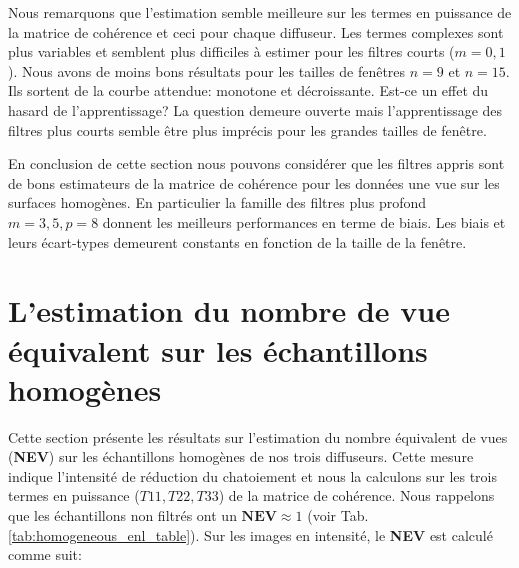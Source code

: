 Nous remarquons que l'estimation semble meilleure sur les termes en puissance de la matrice de cohérence et ceci pour chaque diffuseur.  Les termes complexes sont plus variables et semblent plus difficiles à estimer pour les filtres courts ($m=0,1$). Nous avons de moins bons résultats pour les tailles de fenêtres $n=9$ et $n=15$. Ils sortent de la courbe attendue: monotone et décroissante.  Est-ce un effet du hasard de l'apprentissage? La question demeure ouverte mais l'apprentissage des filtres plus courts semble être plus imprécis pour les grandes tailles de fenêtre.  

En conclusion de cette section nous pouvons considérer que les filtres appris sont de bons estimateurs de la matrice de cohérence pour les données une vue sur les surfaces homogènes. En particulier la famille des filtres plus profond $m=3,  5, p=8$ donnent les meilleurs performances en terme de biais.  Les biais et leurs écart-types demeurent constants en fonction de la taille de la fenêtre. 




\section{L'estimation du nombre de vue équivalent sur les échantillons homogènes}

Cette section présente les résultats sur l'estimation du nombre équivalent de vues (\textbf{NEV}) sur les échantillons homogènes de nos trois diffuseurs.  Cette mesure indique l’intensité de réduction du chatoiement et nous la calculons sur les trois termes en puissance ($T11, T22, T33$) de la matrice de cohérence.  Nous rappelons que les échantillons non filtrés ont un $\textbf{NEV} \approx 1$ (voir Tab.  \ref{tab:homogeneous_enl_table}).  Sur les images en intensité, le \textbf{NEV} est calculé comme suit:

